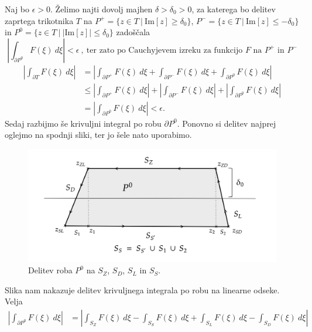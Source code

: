 \documentclass[mat1, tisk]{fmfdelo}
\begin{document}
\begin{dokaz}
        Naj bo $\epsilon > 0$. Želimo najti dovolj majhen $\delta > \delta_0 > 0$, za katerega bo delitev zaprtega trikotnika $T$ na $P^+ = \{z \in T~|~\text{Im}[z] \geq \delta_0\}$, $P^- = \{z \in T~|~\text{Im}[z] \leq -\delta_0\}$ in $P^0 = \{z \in T~|~|\text{Im}[z]| \leq \delta_0\}$ zadoščala
        $$ 
            \left|\int_{\partial P^0}{F(\xi)~d\xi}\right| < \epsilon~,~\text{ter zato po Cauchyjevem izreku za funkcijo $F$ na $P^+$ in $P^-$}
        $$
        \begin{align*}
            \left|\int_{\partial T}{F(\xi)~d\xi}\right| &= \left|\int_{\partial P^+}{F(\xi)~d\xi} + \int_{\partial P^-}{F(\xi)~d\xi} + \int_{\partial P^0}{F(\xi)~d\xi}\right|\\
            &\leq \left|\int_{\partial P^+}{F(\xi)~d\xi} \right|+ \left|\int_{\partial P^-}{F(\xi)~d\xi}\right| + \left|\int_{\partial P^0}{F(\xi)~d\xi}\right| \\ 
            & =\left|\int_{\partial P^0}{F(\xi)~d\xi} \right| < \epsilon.
        \end{align*}
        Sedaj razbijmo še krivuljni integral po robu $\partial P^0$. Ponovno si delitev najprej oglejmo na spodnji sliki, ter jo šele nato uporabimo. 
        \begin{figure}[H]
            \begin{center}
                \includegraphics[width = \textwidth]{schwarz_hol_int.png}
                \caption{Delitev roba $P^0$ na $S_Z$, $S_D$, $S_L$ in $S_S$.}
            \end{center}    
        \end{figure}
        Slika nam nakazuje delitev krivuljnega integrala po robu na linearne odseke. Velja
        \begin{align*}
            \left|\int_{\partial P^0}{F(\xi)~d\xi}\right| &= \left|\int_{S_Z}{F(\xi)~d\xi} - \int_{S_S}{F(\xi)~d\xi} + \int_{S_L}{F(\xi)~d\xi} - \int_{S_D}{F(\xi)~d\xi}\right|\\

\end{align*}
\end{dokaz}
\end{document}
